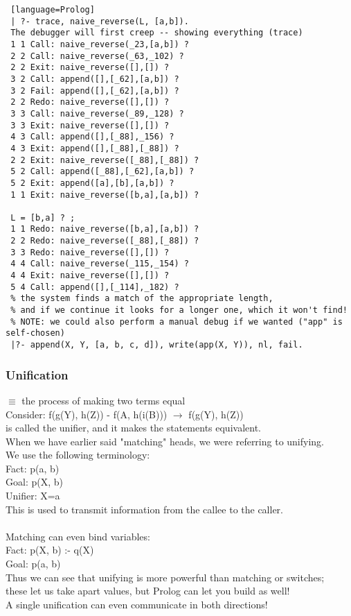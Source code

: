 \documentclass[../../lecture_notes.tex]{subfiles}
\begin{document}
\begin{lstlisting} [language=Prolog]
 | ?- trace, naive_reverse(L, [a,b]).
 The debugger will first creep -- showing everything (trace)
 1 1 Call: naive_reverse(_23,[a,b]) ?
 2 2 Call: naive_reverse(_63,_102) ?
 2 2 Exit: naive_reverse([],[]) ?
 3 2 Call: append([],[_62],[a,b]) ?
 3 2 Fail: append([],[_62],[a,b]) ?
 2 2 Redo: naive_reverse([],[]) ?
 3 3 Call: naive_reverse(_89,_128) ?
 3 3 Exit: naive_reverse([],[]) ?
 4 3 Call: append([],[_88],_156) ?
 4 3 Exit: append([],[_88],[_88]) ?
 2 2 Exit: naive_reverse([_88],[_88]) ?
 5 2 Call: append([_88],[_62],[a,b]) ?
 5 2 Exit: append([a],[b],[a,b]) ?
 1 1 Exit: naive_reverse([b,a],[a,b]) ?
 
 L = [b,a] ? ;
 1 1 Redo: naive_reverse([b,a],[a,b]) ?
 2 2 Redo: naive_reverse([_88],[_88]) ?
 3 3 Redo: naive_reverse([],[]) ?
 4 4 Call: naive_reverse(_115,_154) ?
 4 4 Exit: naive_reverse([],[]) ?
 5 4 Call: append([],[_114],_182) ?
 % the system finds a match of the appropriate length, 
 % and if we continue it looks for a longer one, which it won't find!
 % NOTE: we could also perform a manual debug if we wanted ("app" is self-chosen)
 |?- append(X, Y, [a, b, c, d]), write(app(X, Y)), nl, fail.
\end{lstlisting}

\subsubsection*{Unification}
$\equiv$ the process of making two terms equal\\
Consider: f(g(Y), h(Z)) - f(A, h(i(B))) $\rightarrow$ f(g(Y), h(Z))\\
	 is called the unifier, and it makes the statements equivalent.\\
When we have earlier said "matching" heads, we were referring to unifying.\\
We use the following terminology:\\
	\indent Fact: p(a, b)\\
	\indent Goal: p(X, b)\\
	\indent Unifier: {X=a}\\
This is used to transmit information from the callee to the caller.\\
\\
Matching can even bind variables:\\
	\indent Fact: p(X, b) :- q(X)\\
	\indent Goal: p(a, b)\\
Thus we can see that unifying is more powerful than matching or switches;\\
	\indent these let us take apart values, but Prolog can let you build as well!
\\
A single unification can even communicate in both directions!\\
\end{document}

